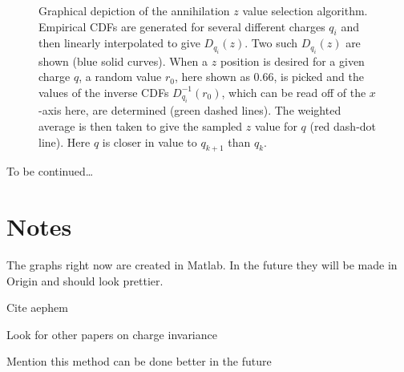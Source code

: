 \documentclass[superscriptaddress,aps,prb,11pt]{revtex4-1}
\begin{document}
\begin{figure}
  \caption{Graphical depiction of the annihilation $z$ value selection algorithm.  Empirical CDFs are generated for several different charges $q_i$ and then linearly interpolated to give $D_{q_i}(z)$.  Two such $D_{q_i}(z)$ are shown (blue solid curves).  When a $z$ position is desired for a given charge $q$, a random value $r_0$, here shown as 0.66, is picked and the values of the inverse CDFs $D^{-1}_{q_i}(r_0)$, which can be read off of the $x$-axis here, are determined (green dashed lines).  The weighted average is then taken to give the sampled $z$ value for $q$ (red dash-dot line).  Here $q$ is closer in value to $q_{k+1}$ than $q_k$.}
  \label{fig:z_interpolation}
\end{figure}

\begin{acknowledgments}
To be continued\ldots
\end{acknowledgments}

\section{Notes}
The graphs right now are created in Matlab.  In the future they will be made in Origin and should look prettier.

Cite aephem

Look for other papers on charge invariance

Mention this method can be done better in the future

\nocite{fractionalcharge}


\end{document}
